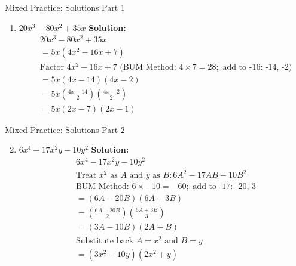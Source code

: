 \documentclass[aspectratio=169]{beamer}
\begin{document}
\begin{frame}{Mixed Practice: Solutions Part 1}
    \begin{tcolorbox}[colback=lightgray,colframe=accent,title=Detailed Solutions]
        \footnotesize
        \begin{enumerate}
            \setlength{\itemsep}{0.5em}
            \item $20x^3 - 80x^2 + 35x$
            \quad \textbf{Solution:}
            \begin{align*}
                & 20x^3 - 80x^2 + 35x \\
                &= 5x(4x^2 - 16x + 7) \\
                & \text{Factor } 4x^2 - 16x + 7 \text{ (BUM Method: } 4 \times 7 = 28; \text{ add to -16: -14, -2)} \\
                &= 5x(4x - 14)(4x - 2) \\
                &= 5x\left(\frac{4x - 14}{2}\right)\left(\frac{4x - 2}{2}\right) \\
                &= 5x(2x - 7)(2x - 1)
            \end{align*}
        \end{enumerate}
    \end{tcolorbox}
\end{frame}

\begin{frame}{Mixed Practice: Solutions Part 2}
    \begin{tcolorbox}[colback=lightgray,colframe=accent,title=Detailed Solutions]
        \footnotesize
        \begin{enumerate}
            \setcounter{enumi}{1}
            \setlength{\itemsep}{0.5em}
            \item $6x^4 - 17x^2y - 10y^2$
            \quad \textbf{Solution:}
            \begin{align*}
                & 6x^4 - 17x^2y - 10y^2 \\
                & \text{Treat } x^2 \text{ as } A \text{ and } y \text{ as } B: 6A^2 - 17AB - 10B^2 \\
                & \text{BUM Method: } 6 \times -10 = -60; \text{ add to -17: -20, 3} \\
                &= (6A - 20B)(6A + 3B) \\
                &= \left(\frac{6A - 20B}{2}\right)\left(\frac{6A + 3B}{3}\right) \\
                &= (3A - 10B)(2A + B) \\
                & \text{Substitute back } A = x^2 \text{ and } B = y \\
                &= (3x^2 - 10y)(2x^2 + y)
            \end{align*}
        \end{enumerate}
    \end{tcolorbox}
\end{frame}
\end{document}
